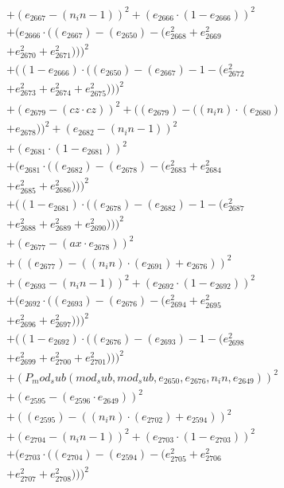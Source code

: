 \documentclass[10pt, a4paper]{article}
\begin{document}
\begin{small}
\begin{align*}
& + (e_{2667} - (n_in - 1))^{2} + (e_{2666}  \cdot  (1 - e_{2666}))^{2} \\
& + (e_{2666}  \cdot  ((e_{2667}) - (e_{2650}) - (e_{2668}^{2} + e_{2669}^{2} \\
& + e_{2670}^{2} + e_{2671}^{2})))^{2} \\
& + ((1 - e_{2666})  \cdot  ((e_{2650}) - (e_{2667}) - 1 - (e_{2672}^{2} \\
& + e_{2673}^{2} + e_{2674}^{2} + e_{2675}^{2})))^{2} \\
& + (e_{2679} - (cz  \cdot  cz))^{2} + ((e_{2679}) - ((n_in)  \cdot  (e_{2680}) \\
& + e_{2678}))^{2} + (e_{2682} - (n_in - 1))^{2} \\
& + (e_{2681}  \cdot  (1 - e_{2681}))^{2} \\
& + (e_{2681}  \cdot  ((e_{2682}) - (e_{2678}) - (e_{2683}^{2} + e_{2684}^{2} \\
& + e_{2685}^{2} + e_{2686}^{2})))^{2} \\
& + ((1 - e_{2681})  \cdot  ((e_{2678}) - (e_{2682}) - 1 - (e_{2687}^{2} \\
& + e_{2688}^{2} + e_{2689}^{2} + e_{2690}^{2})))^{2} \\
& + (e_{2677} - (ax  \cdot  e_{2678}))^{2} \\
& + ((e_{2677}) - ((n_in)  \cdot  (e_{2691}) + e_{2676}))^{2} \\
& + (e_{2693} - (n_in - 1))^{2} + (e_{2692}  \cdot  (1 - e_{2692}))^{2} \\
& + (e_{2692}  \cdot  ((e_{2693}) - (e_{2676}) - (e_{2694}^{2} + e_{2695}^{2} \\
& + e_{2696}^{2} + e_{2697}^{2})))^{2} \\
& + ((1 - e_{2692})  \cdot  ((e_{2676}) - (e_{2693}) - 1 - (e_{2698}^{2} \\
& + e_{2699}^{2} + e_{2700}^{2} + e_{2701}^{2})))^{2} \\
& + (P_mod_sub(mod_sub, mod_sub, e_{2650}, e_{2676}, n_in, e_{2649}))^{2} \\
& + (e_{2595} - (e_{2596}  \cdot  e_{2649}))^{2} \\
& + ((e_{2595}) - ((n_in)  \cdot  (e_{2702}) + e_{2594}))^{2} \\
& + (e_{2704} - (n_in - 1))^{2} + (e_{2703}  \cdot  (1 - e_{2703}))^{2} \\
& + (e_{2703}  \cdot  ((e_{2704}) - (e_{2594}) - (e_{2705}^{2} + e_{2706}^{2} \\
& + e_{2707}^{2} + e_{2708}^{2})))^{2} \\

\end{align*}
\end{small}
\end{document}
